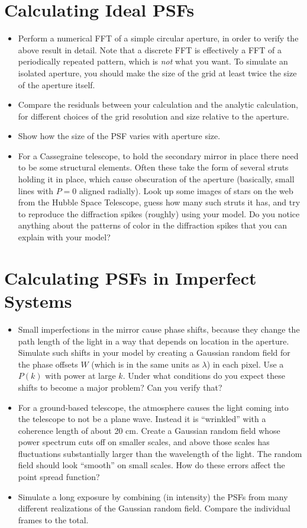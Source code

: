 \documentclass[11pt, preprint]{aastex}
\begin{document}
\section{Calculating Ideal PSFs}

\begin{itemize}
\item Perform a numerical FFT of a simple circular aperture, in order
  to verify the above result in detail. Note that a discrete FFT is
  effectively a FFT of a periodically repeated pattern, which is {\it
    not} what you want. To simulate an isolated aperture, you should
  make the size of the grid at least twice the size of the aperture
  itself.
\item Compare the residuals between your calculation and the analytic
  calculation, for different choices of the grid resolution and size
  relative to the aperture.
\item Show how the size of the PSF varies with aperture size.
\item For a Cassegraine telescope, to hold the secondary mirror in
  place there need to be some structural elements.  Often these take
  the form of several struts holding it in place, which cause
  obscuration of the aperture (basically, small lines with $P=0$
  aligned radially). Look up some images of stars on the web from the
  Hubble Space Telescope, guess how many such struts it has, and try
  to reproduce the diffraction spikes (roughly) using your model. Do
  you notice anything about the patterns of color in the diffraction
  spikes that you can explain with your model?
\end{itemize}

\section{Calculating PSFs in Imperfect Systems}

\begin{itemize} 
\item Small imperfections in the mirror cause phase shifts, because
  they change the path length of the light in a way that depends on
  location in the aperture. Simulate such shifts in your model by
  creating a Gaussian random field for the phase offsets $W$ (which is
  in the same units as $\lambda$) in each pixel. Use a $P(k)$ with
  power at large $k$. Under what conditions do you expect these shifts
  to become a major problem? Can you verify that?
\item For a ground-based telescope, the atmosphere causes the light
  coming into the telescope to not be a plane wave. Instead it is
  ``wrinkled'' with a coherence length of about 20 cm. Create a
  Gaussian random field whose power spectrum cuts off on smaller
  scales, and above those scales has fluctuations substantially larger
  than the wavelength of the light. The random field should look
  ``smooth'' on small scales.  How do these errors affect the point
  spread function?
\item Simulate a long exposure by combining (in intensity) the PSFs
  from many different realizations of the Gaussian random
  field. Compare the individual frames to the total.
\end{itemize}
\end{document}
